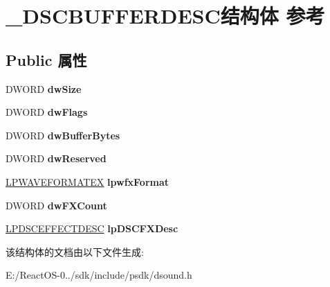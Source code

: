 \hypertarget{struct___d_s_c_b_u_f_f_e_r_d_e_s_c}{}\section{\+\_\+\+D\+S\+C\+B\+U\+F\+F\+E\+R\+D\+E\+S\+C结构体 参考}
\label{struct___d_s_c_b_u_f_f_e_r_d_e_s_c}
\subsection*{Public 属性}
\begin{DoxyCompactItemize}
\item 
\mbox{\label{struct___d_s_c_b_u_f_f_e_r_d_e_s_c_ae257294217c46127eec37cd198bad923}} 
D\+W\+O\+RD {\bfseries dw\+Size}
\item 
\mbox{\label{struct___d_s_c_b_u_f_f_e_r_d_e_s_c_aeac514001b797bb0744660e254d621eb}} 
D\+W\+O\+RD {\bfseries dw\+Flags}
\item 
\mbox{\label{struct___d_s_c_b_u_f_f_e_r_d_e_s_c_a82d69f6f4cfb534c50bd4cfc7e2448a8}} 
D\+W\+O\+RD {\bfseries dw\+Buffer\+Bytes}
\item 
\mbox{\label{struct___d_s_c_b_u_f_f_e_r_d_e_s_c_ac4b51280006b2bcf3f5b43aa72067ab8}} 
D\+W\+O\+RD {\bfseries dw\+Reserved}
\item 
\mbox{\label{struct___d_s_c_b_u_f_f_e_r_d_e_s_c_aab38ebfa56e1d436a06fbdf4b9641505}} 
\hyperlink{struct___w_a_v_e_f_o_r_m_a_t_e_x}{L\+P\+W\+A\+V\+E\+F\+O\+R\+M\+A\+T\+EX} {\bfseries lpwfx\+Format}
\item 
\mbox{\label{struct___d_s_c_b_u_f_f_e_r_d_e_s_c_ab31dec03217fd023989c8131101039d6}} 
D\+W\+O\+RD {\bfseries dw\+F\+X\+Count}
\item 
\mbox{\label{struct___d_s_c_b_u_f_f_e_r_d_e_s_c_a2a70bfa0614a82c0a26c70b29cf1442d}} 
\hyperlink{struct___d_s_c_e_f_f_e_c_t_d_e_s_c}{L\+P\+D\+S\+C\+E\+F\+F\+E\+C\+T\+D\+E\+SC} {\bfseries lp\+D\+S\+C\+F\+X\+Desc}
\end{DoxyCompactItemize}


该结构体的文档由以下文件生成\+:\begin{DoxyCompactItemize}
\item 
E\+:/\+React\+O\+S-\/0../sdk/include/psdk/dsound.\+h\end{DoxyCompactItemize}
